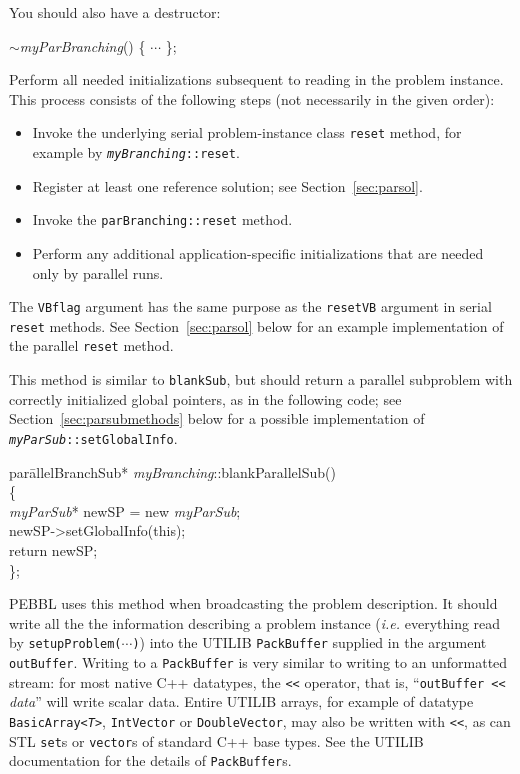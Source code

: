 You should also have a destructor:
\begin{codeblock}
$\sim$\emph{myParBranching}() \{ $\cdots$ \}; \\
\end{codeblock}

Perform all needed initializations subsequent to reading in the
problem instance.  This process consists of the following steps (not
necessarily in the given order):
\begin{itemize}
\item Invoke the underlying serial problem-instance class
  \texttt{reset} method, for example by
  \texttt{\emph{myBranching}::reset}.
\item Register at least one reference solution; see
  Section~\ref{sec:parsol}.
\item Invoke the \texttt{parBranching::reset} method.
\item Perform any additional application-specific initializations that
  are needed only by parallel runs.
\end{itemize}
The \texttt{VBflag} argument has the same purpose as the
\texttt{resetVB} argument in serial \texttt{reset} methods.  See
Section~\ref{sec:parsol} below for an example implementation of the
parallel \texttt{reset} method.

 This method is similar to
\texttt{blankSub}, but should return a parallel subproblem with
correctly initialized global pointers, as in the following code; see
Section~\ref{sec:parsubmethods} below for a possible implementation of
\texttt{\emph{myParSub}::setGlobalInfo}.
\begin{codeblock}
par\=allelBranchSub* \emph{myBranching}::blankParallelSub() \\
\{ \\
\>   \emph{myParSub}* newSP = new \emph{myParSub}; \\
\>    newSP->setGlobalInfo(this);\\
\>    return newSP; \\
\};
\end{codeblock}

 PEBBL uses this
method when broadcasting the problem description.  It should write all
the the information describing a problem instance (\emph{i.e.}
everything read by \texttt{setupProblem($\cdots$)}) into the UTILIB
\texttt{PackBuffer} supplied in the argument \texttt{outBuffer}.
Writing to a \texttt{PackBuffer} is very similar to writing to an
unformatted stream: for most native C++ datatypes, the \texttt{<<}
operator, that is, ``\texttt{outBuffer <<} \emph{data}'' will write
scalar data.  Entire UTILIB arrays, for example of datatype
\texttt{BasicArray<\textit{T}>}, 
\texttt{IntVector} or \texttt{DoubleVector}, may also be written with
\texttt{<<}, as can STL \texttt{set}s or 
\texttt{vector}s of standard C++ base types.
See the UTILIB documentation for the details of \texttt{PackBuffer}s.

